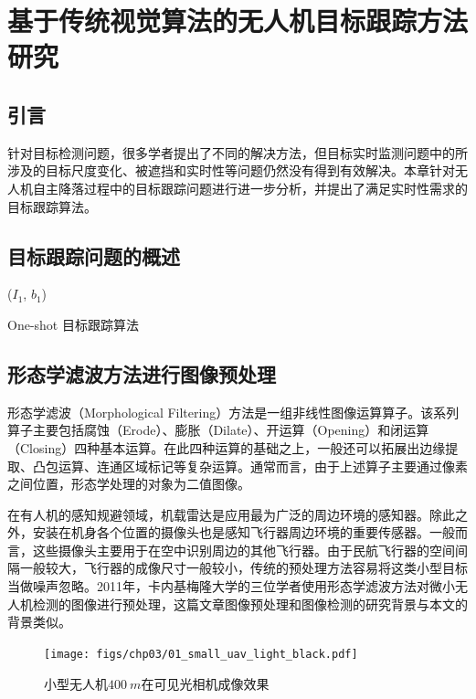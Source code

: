 \chapter{基于传统视觉算法的无人机目标跟踪方法研究}


\section{引言}
针对目标检测问题，很多学者提出了不同的解决方法，但目标实时监测问题中的所涉及的目标尺度变化、被遮挡和实时性等问题仍然没有得到有效解决。本章针对无人机自主降落过程中的目标跟踪问题进行进一步分析，并提出了满足实时性需求的目标跟踪算法。

\section{目标跟踪问题的概述}

\begin{algorithm2e}[H]
	\SetAlgoLined
	\BlankLine
	\Initialization($I_1$, $b_1$)\;
	\caption{One-shot 目标跟踪算法}
\end{algorithm2e}


\section{形态学滤波方法进行图像预处理}

形态学滤波（Morphological Filtering）方法是一组非线性图像运算算子。该系列算子主要包括腐蚀（Erode）、膨胀（Dilate）、开运算（Opening）和闭运算（Closing）四种基本运算。在此四种运算的基础之上，一般还可以拓展出边缘提取、凸包运算、连通区域标记等复杂运算。通常而言，由于上述算子主要通过像素之间位置，形态学处理的对象为二值图像。

在有人机的感知规避领域，机载雷达是应用最为广泛的周边环境的感知器。除此之外，安装在机身各个位置的摄像头也是感知飞行器周边环境的重要传感器。一般而言，这些摄像头主要用于在空中识别周边的其他飞行器。由于民航飞行器的空间间隔一般较大，飞行器的成像尺寸一般较小，传统的预处理方法容易将这类小型目标当做噪声忽略。2011年，卡内基梅隆大学的三位学者使用形态学滤波方法对微小无人机检测的图像进行预处理\cite{dey2011cascaded}，这篇文章图像预处理和图像检测的研究背景与本文的背景类似。
\begin{figure}[htb]   
	\centering
	\texttt{[image: figs/chp03/01\_small\_uav\_light\_black.pdf]}
	\caption{小型无人机$400\ m$在可见光相机成像效果}
	\label{fig:01_small_uav_light_black}
\end{figure}

